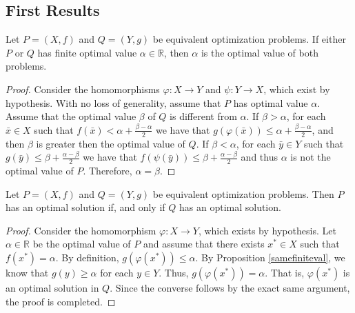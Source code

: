 \documentclass[a4paper]{article}
\begin{document}
\subsection*{First Results}
\begin{lemma}\label{samefiniteval}
  Let \(P=(X,f)\) and \(Q=(Y,g)\) be equivalent optimization problems. If either \(P\) or
\(Q\) has finite optimal value \(\alpha\in\mathbb{R}\), then \(\alpha\) is the
optimal value of both problems. 
\end{lemma}
\begin{proof}
Consider the homomorphisms \(\varphi\colon X\to Y\) and \(\psi\colon Y\to X\),
which exist by hypothesis. With no loss of generality, assume that \(P\) has
optimal value \(\alpha\). Assume that the optimal value \(\beta\) of \(Q\) is
different from \(\alpha\).
If \(\beta > \alpha\), for each \(\bar{x}\in X\) such that
\(f(\bar{x})<\alpha+\frac{\beta-\alpha}{2}\) we have that
\(g(\varphi(\bar{x}))\leq\alpha+\frac{\beta-\alpha}{2}\), and then \(\beta\) is
greater then the optimal value of \(Q\). If \(\beta < \alpha\), for each
\(\bar{y}\in Y\) such that \(g(\bar{y})\leq \beta+\frac{\alpha-\beta}{2}\) we
have that \(f(\psi(\bar{y}))\leq\beta+\frac{\alpha-\beta}{2}\) and thus
\(\alpha\) is not the optimal value of \(P\). Therefore, \(\alpha=\beta\).
\end{proof}
\begin{lemma}\label{bothoptsols}
Let \(P=(X,f)\) and \(Q=(Y,g)\) be equivalent optimization problems. Then \(P\) has an
optimal solution if, and only if \(Q\) has an optimal solution.
\end{lemma}
\begin{proof}
Consider the homomorphism \(\varphi\colon X\to Y\),
which exists by hypothesis. Let \(\alpha\in\mathbb{R}\) be the optimal value of \(P\) and assume that there
exists \(x^\ast\in X\) such that \(f(x^\ast)=\alpha\). By definition,
\(g(\varphi(x^\ast))\leq\alpha\). By Proposition \ref{samefiniteval}, we know that
\(g(y)\geq\alpha\) for each \(y\in Y\). Thus, \(g(\varphi(x^\ast))=\alpha\). That
is, \(\varphi(x^\ast)\) is an optimal solution in \(Q\). Since the converse follows
by the exact same argument, the proof is completed.
\end{proof}
\end{document}
